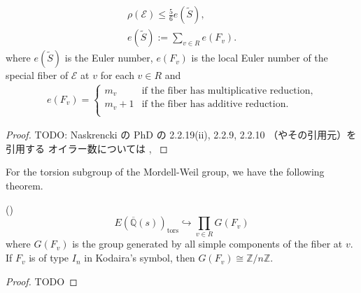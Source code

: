 \documentclass[main]{subfiles}
\begin{document}
\begin{thm}
    \label{thm:rho}
    \begin{align}
        \rho(\mathcal{E}) \leq \frac{5}{6} e(\tilde{S}), \\
        e(\tilde{S}) := \sum_{v \in R} e(F_{v}).
    \end{align}
    where $e(\tilde{S})$ is the Euler number, $e(F_{v})$ is the local Euler number of the special fiber of $\mathcal{E}$ at $v$ for each $v \in R$ and
    \begin{align}
        e(F_{v}) = \begin{cases}
                       m_v     & \text{if the fiber has multiplicative reduction}, \\
                       m_v + 1 & \text{if the fiber has additive reduction}.       \\
                   \end{cases}
    \end{align}
\end{thm}
\begin{proof}
    TODO: Naskrencki の PhD の 2.2.19(ii), 2.2.9, 2.2.10 （やその引用元）を引用する
    オイラー数については \cite[pp. 136-137 付録2]{ref:shioda1993}, \cite[p.14 Table II]{ref:kodaira1963-3}
\end{proof}

For the torsion subgroup of the Mordell-Weil group, we have the following theorem.
\begin{thm}{(\cite[Lem.3.5]{ref:naskrecki2013})}
    \label{thm:torsion}
    \begin{equation}
        E(\overline{\mathbb{Q}}(s))_{\text{tors}} \hookrightarrow \prod_{v \in R} G(F_{v})
    \end{equation}
    where $G(F_{v})$ is the group generated by all simple components of the fiber at $v$.
    If $F_v$ is of type $I_n$ in Kodaira's symbol, then $G(F_{v}) \cong \mathbb{Z} / n \mathbb{Z}$.
\end{thm}
\begin{proof}
    TODO
\end{proof}
\end{document}

